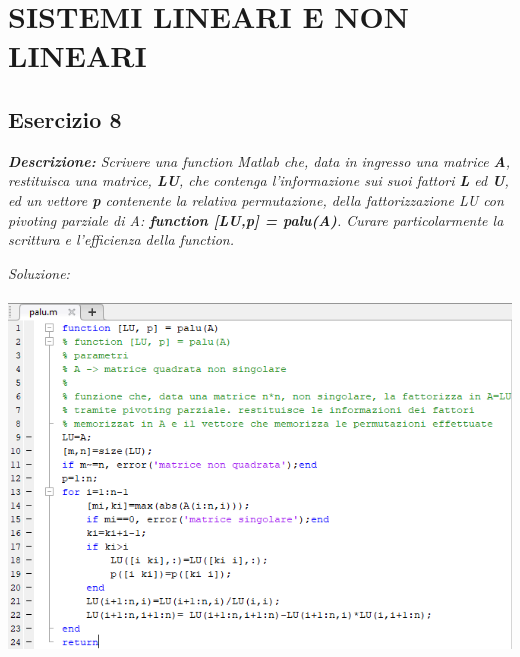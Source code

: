 \chapter{SISTEMI LINEARI E NON LINEARI}
\section{Esercizio 8}
\textit{\textbf{Descrizione:} Scrivere una function Matlab che, data in ingresso una matrice \textbf{A}, restituisca una matrice, \textbf{LU}, che contenga l'informazione sui suoi fattori \textbf{L} ed \textbf{U}, ed un vettore \textbf{p} contenente la relativa permutazione, della fattorizzazione LU con pivoting parziale di A: \textbf{function [LU,p] = palu(A)}. Curare particolarmente la scrittura e l'efficienza della function.}\newline

\emph{Soluzione:}\\~\\

\includegraphics[width=1.3\linewidth]{img/palu}\newpage